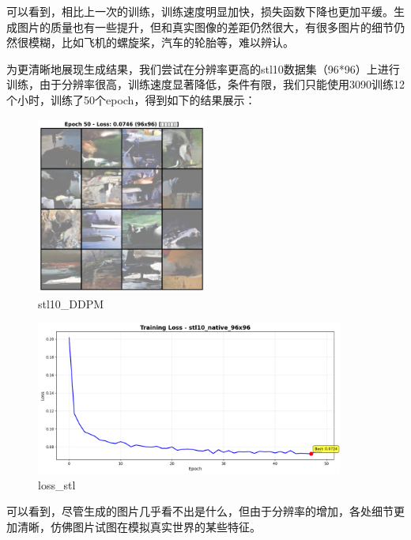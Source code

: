 \documentclass{ctexart}
\begin{document}
可以看到，相比上一次的训练，训练速度明显加快，损失函数下降也更加平缓。生成图片的质量也有一些提升，但和真实图像的差距仍然很大，有很多图片的细节仍然很模糊，比如飞机的螺旋桨，汽车的轮胎等，难以辨认。

为更清晰地展现生成结果，我们尝试在分辨率更高的stl10数据集（96*96）上进行训练，由于分辨率很高，训练速度显著降低，条件有限，我们只能使用3090训练12个小时，训练了50个epoch，得到如下的结果展示：
\begin{figure}[H]
     \centering
     \includegraphics[width=0.5\textwidth]{epoch_50_samples_stl.png}
     \caption{stl10\_DDPM}
     \label{fig:stl10_ddpm}  %
\end{figure}

\begin{figure}[H]
     \centering
     \includegraphics[width=0.9\textwidth]{loss_stl.png}
     \caption{loss\_stl}
     \label{fig:loss_stl}  %
\end{figure}

可以看到，尽管生成的图片几乎看不出是什么，但由于分辨率的增加，各处细节更加清晰，仿佛图片试图在模拟真实世界的某些特征。
\end{document}

